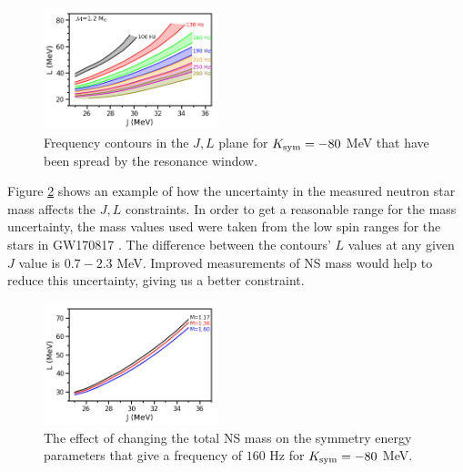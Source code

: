 \documentclass[fleqn,usenatbib]{mnras}
\begin{document}
\begin{figure}
\centering
\includegraphics[width=0.45\textwidth,angle=0]{JL_spread_due_to_df_grid_nonucl.png}
\caption{Frequency contours in the $J,L$ plane for $K_{\rm sym}=-80$ MeV that have been spread by the resonance window.}
\label{fig:t_res_spread}
\end{figure}

\hspace{\parindent}Figure \ref{fig:vary_mass_contours} shows an example of how the uncertainty in the measured neutron star mass affects the $J,L$ constraints. In order to get a reasonable range for the mass uncertainty, the mass values used were taken from the low spin ranges for the stars in GW170817 \citet{abbott2017merger}. The difference between the contours' $L$ values at any given $J$ value is $0.7-2.3$ MeV. Improved measurements of NS mass would help to reduce this uncertainty, giving us a better constraint.

\begin{figure}
\centering
\includegraphics[width=0.45\textwidth,angle=0]{Mcomp_f160_30_50_-80.png}
\caption{The effect of changing the total NS mass on the symmetry energy parameters that give a frequency of $160$ Hz for $K_{\rm sym}=-80$ MeV.}
\label{fig:vary_mass_contours}
\end{figure}
\end{document}
